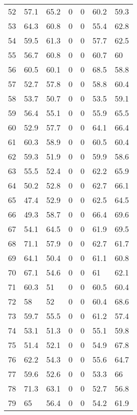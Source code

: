 \begin{longtable}{lllllll}
52  & 57.1 & 65.2 & 0       & 0       & 60.2 & 59.3 \\
53  & 64.3 & 60.8 & 0       & 0       & 55.4 & 62.8 \\
54  & 59.5 & 61.3 & 0       & 0       & 57.7 & 62.5 \\
55  & 56.7 & 60.8 & 0       & 0       & 60.7 & 60   \\
56  & 60.5 & 60.1 & 0       & 0       & 68.5 & 58.8 \\
57  & 52.7 & 57.8 & 0       & 0       & 58.8 & 60.4 \\
58  & 53.7 & 50.7 & 0       & 0       & 53.5 & 59.1 \\
59  & 56.4 & 55.1 & 0       & 0       & 55.9 & 65.5 \\
60  & 52.9 & 57.7 & 0       & 0       & 64.1 & 66.4 \\
61  & 60.3 & 58.9 & 0       & 0       & 60.5 & 60.4 \\
62  & 59.3 & 51.9 & 0       & 0       & 59.9 & 58.6 \\
63  & 55.5 & 52.4 & 0       & 0       & 62.2 & 65.9 \\
64  & 50.2 & 52.8 & 0       & 0       & 62.7 & 66.1 \\
65  & 47.4 & 52.9 & 0       & 0       & 62.5 & 64.5 \\
66  & 49.3 & 58.7 & 0       & 0       & 66.4 & 69.6 \\
67  & 54.1 & 64.5 & 0       & 0       & 61.9 & 69.5 \\
68  & 71.1 & 57.9 & 0       & 0       & 62.7 & 61.7 \\
69  & 64.1 & 50.4 & 0       & 0       & 61.1 & 60.8 \\
70  & 67.1 & 54.6 & 0       & 0       & 61   & 62.1 \\
71  & 60.3 & 51   & 0       & 0       & 60.5 & 60.4 \\
72  & 58   & 52   & 0       & 0       & 60.4 & 68.6 \\
73  & 59.7 & 55.5 & 0       & 0       & 61.2 & 57.4 \\
74  & 53.1 & 51.3 & 0       & 0       & 55.1 & 59.8 \\
75  & 51.4 & 52.1 & 0       & 0       & 54.9 & 67.8 \\
76  & 62.2 & 54.3 & 0       & 0       & 55.6 & 64.7 \\
77  & 59.6 & 52.6 & 0       & 0       & 53.3 & 66   \\
78  & 71.3 & 63.1 & 0       & 0       & 52.7 & 56.8 \\
79  & 65   & 56.4 & 0       & 0       & 54.2 & 61.9 \\

\end{longtable}
